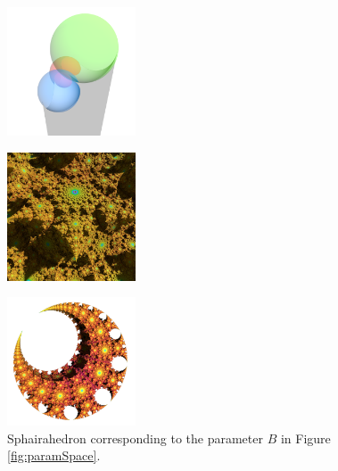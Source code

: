\begin{figure}[htbp]
 \begin{minipage}[t]{0.5\textwidth}
  \begin{minipage}[t]{0.24\textwidth}
   \centering
   \includegraphics[width=1.5in, height=1.5in, keepaspectratio]{./img/application/sphairahedron/derivation/prism0864.png}
   \label{fig:pointBSphaira}
  \end{minipage}
  \hspace*{\fill}
  \begin{minipage}[t]{0.24\textwidth}
   \centering
   \includegraphics[width=1.5in, height=1.5in,
   keepaspectratio]{./img/application/sphairahedron/derivation/limit0864.jpg}
   \label{fig:pointBLimit}
  \end{minipage}
  \hspace*{\fill}
  \caption{Sphairahedron corresponding to the parameter $B$
  in Figure \ref{fig:paramSpace}.}
  \label{fig:pointB}
 \end{minipage}
 \hspace*{\fill}
 \begin{minipage}[t]{0.5\textwidth}
  \begin{minipage}[t]{0.24\textwidth}
   \centering
   \includegraphics[width=1.5in, height=1.5in,
   keepaspectratio]{./img/application/sphairahedron/derivation/conj1.png}

\end{minipage}
\end{minipage}
\end{figure}
